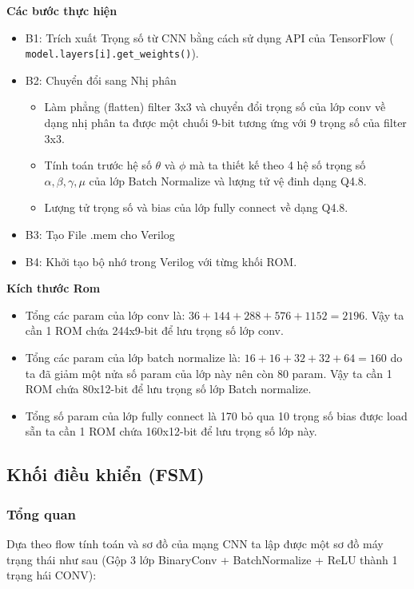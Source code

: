 \textbf{Các bước thực hiện}
\begin{itemize}
    \item B1: Trích xuất Trọng số từ CNN bằng cách sử dụng API của TensorFlow ( \texttt{model.layers[i].get\_weights()}).
    \item B2: Chuyển đổi sang Nhị phân
    \begin{itemize}
        \item Làm phẳng (flatten) filter 3x3 và chuyển đổi trọng số của lớp conv về dạng nhị phân ta được một chuối 9-bit tương ứng với 9 trọng số của filter 3x3.
        \item Tính toán trước hệ số $\theta$ và $\phi$ mà ta thiết kế theo 4 hệ số trọng số $\alpha,\beta,\gamma,\mu$ của lớp Batch Normalize và lượng tử vệ đinh dạng Q4.8.
        \item Lượng tử trọng số và bias của lớp fully connect về dạng Q4.8.
    \end{itemize}
    \item B3: Tạo File .mem cho Verilog
    \item B4: Khởi tạo bộ nhớ trong Verilog với từng khối ROM.
\end{itemize}
\textbf{Kích thước Rom}
\begin{itemize}
    \item Tổng các param của lớp conv là: $36+144+288+576+1152=2196$. Vậy ta cần 1 ROM chứa 244x9-bit để lưu trọng số lớp conv.
    \item Tổng các param của lớp batch normalize là: $16+16+32+32+64=160$ do ta đã giảm một nửa số param của lớp này nên còn 80 param. Vậy ta cần 1 ROM chứa 80x12-bit để lưu trọng số lớp Batch normalize.
    \item Tổng số param của lớp fully connect là 170 bỏ qua 10 trọng số bias được load sẵn ta cần 1 ROM chứa 160x12-bit để lưu trọng số lớp này.
\end{itemize}



\subsection{Khối điều khiển (FSM)}
\subsubsection{Tổng quan}
Dựa theo flow tính toán và sơ đồ của mạng CNN ta lập được một sơ đồ máy trạng thái như sau (Gộp 3 lớp BinaryConv + BatchNormalize + ReLU thành 1 trạng hái CONV):


